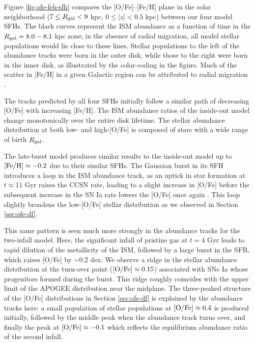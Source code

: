 \documentclass[twocolumn,twocolappendix]{aastex631}
\begin{document}
Figure \ref{fig:ofe-feh-sfh} compares the [O/Fe]--[Fe/H] plane in the solar neighborhood ($7\leq R_{\rm gal}<9$ kpc, $0\leq|z|<0.5$ kpc) between our four model SFHs. The black curves represent the ISM abundance as a function of time in the $R_{\rm gal}=8.0-8.1$ kpc zone; in the absence of radial migration, all model stellar populations would lie close to these lines. Stellar populations to the left of the abundance tracks were born in the outer disk, while those to the right were born in the inner disk, as illustrated by the color-coding in the figure. Much of the scatter in [Fe/H] in a given Galactic region can be attributed to radial migration \citep{Edvardsson1993-ChemicalEvolution}.

The tracks predicted by all four SFHs initially follow a similar path of decreasing [O/Fe] with increasing [Fe/H]. The ISM abundance ratios of the inside-out model change monotonically over the entire disk lifetime. The stellar abundance distribution at both low- and high-[O/Fe] is composed of stars with a wide range of birth $R_{\rm gal}$. 

The late-burst model produces similar results to the inside-out model up to ${\rm [Fe/H]}\approx-0.2$ due to their similar SFHs. The Gaussian burst in its SFH introduces a loop in the ISM abundance track, as an uptick in star formation at $t\approx11$ Gyr raises the CCSN rate, leading to a slight increase in [O/Fe] before the subsequent increase in the SN Ia rate lowers the [O/Fe] once again \citep[see e.g. Figure 1 of][]{JohnsonWeinberg2020-Starbursts}. This loop slightly broadens the low-[O/Fe] stellar distribution as we observed in Section \ref{sec:ofe-df}.

This same pattern is seen much more strongly in the abundance tracks for the two-infall model. Here, the significant infall of pristine gas at $t=4$ Gyr leads to rapid dilution of the metallicity of the ISM, followed by a large burst in the SFR, which raises [O/Fe] by $\sim 0.2$ dex. We observe a ridge in the stellar abundance distribution at the turn-over point (${\rm [O/Fe]}\approx0.15$) associated with SNe Ia whose progenitors formed during the burst. This ridge roughly coincides with the upper limit of the APOGEE distribution near the midplane. The three-peaked structure of the [O/Fe] distributions in Section \ref{sec:ofe-df} is explained by the abundance tracks here: a small population of stellar populations at ${\rm [O/Fe]}\approx0.4$ is produced initially, followed by the middle peak when the abundance track turns over, and finally the peak at ${\rm [O/Fe]}\approx-0.1$ which reflects the equilibrium abundance ratio of the second infall.
\end{document}
